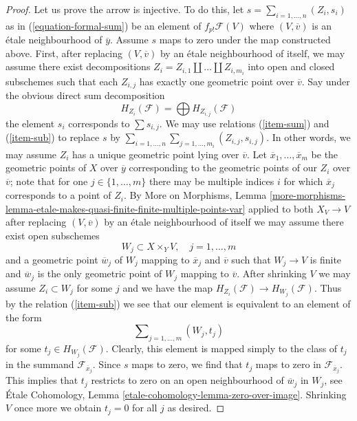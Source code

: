 \documentclass{stacks-project}
\theoremstyle{plain}
\theoremstyle{definition}
\theoremstyle{remark}
\numberwithin{equation}{subsection}
\begin{document}
\begin{proof}
\medskip\noindent
Let us prove the arrow is injective. To do this, let
$s = \sum_{i = 1, \ldots, n} (Z_i, s_i)$ as in (\ref{equation-formal-sum})
be an element of $f_{p!}\mathcal{F}(V)$ where $(V, \overline{v})$ is an
\'etale neighbourhood of $\overline{y}$. Assume $s$ maps to zero
under the map constructed above. First, after replacing
$(V, \overline{v})$ by an \'etale neighbourhood of itself,
we may assume there exist decompositions
$Z_i = Z_{i, 1} \amalg \ldots \amalg Z_{i, m_i}$ into open and closed
subschemes such that each $Z_{i, j}$ has exactly one geometric point
over $\overline{v}$. Say under the obvious direct sum decomposition
$$
H_{Z_i}(\mathcal{F}) = \bigoplus H_{Z_{i, j}}(\mathcal{F})
$$
the element $s_i$ corresponds to $\sum s_{i, j}$. We may use relations
(\ref{item-sum}) and (\ref{item-sub}) to replace $s$ by
$\sum_{i = 1, \ldots, n} \sum_{j = 1, \ldots, m_i} (Z_{i, j}, s_{i, j})$.
In other words, we may assume $Z_i$ has a unique geometric point
lying over $\overline{v}$. Let $\overline{x}_1, \ldots, \overline{x}_m$
be the geometric points of $X$ over $\overline{y}$ corresponding to
the geometric points of our $Z_i$ over $\overline{v}$; note that for
one $j \in \{1, \ldots, m\}$ there may be multiple indices $i$ for which
$\overline{x}_j$ corresponds to a point of $Z_i$.
By More on Morphisms, Lemma
\ref{more-morphisms-lemma-etale-makes-quasi-finite-finite-multiple-points-var}
applied to both $X_V \to V$
after replacing $(V, \overline{v})$ by an \'etale neighbourhood of itself
we may assume there exist open subschemes
$$
W_j \subset X \times_Y V,\quad j = 1, \ldots, m
$$
and a geometric point $\overline{w}_j$ of $W_j$ mapping to $\overline{x}_j$ and
$\overline{v}$ such that $W_j \to V$ is finite and $\overline{w}_j$ is the
only geometric point of $W_j$ mapping to $\overline{v}$.
After shrinking $V$ we may assume $Z_i \subset W_j$ for some $j$
and we have the map $H_{Z_i}(\mathcal{F}) \to H_{W_j}(\mathcal{F})$.
Thus by the relation (\ref{item-sub})
we see that our element is equivalent to an element of the form
$$
\sum\nolimits_{j = 1, \ldots, m} (W_j, t_j)
$$
for some $t_j \in H_{W_j}(\mathcal{F})$. Clearly, this element is mapped
simply to the class of $t_j$ in the summand $\mathcal{F}_{\overline{x}_j}$.
Since $s$ maps to zero, we find that $t_j$ maps to zero in
$\mathcal{F}_{\overline{x}_j}$. This implies that $t_j$ restricts
to zero on an open neighbourhood of $\overline{w}_j$ in $W_j$, see
\'Etale Cohomology, Lemma \ref{etale-cohomology-lemma-zero-over-image}.
Shrinking $V$ once more we obtain $t_j = 0$ for all $j$ as desired.
\end{proof}
\end{document}
